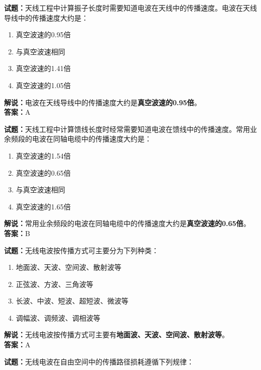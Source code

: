 \documentclass{ctexbook}
\begin{document}
\noindent\textbf{试题：}天线工程中计算振子长度时需要知道电波在天线中的传播速度。电波在天线导线中的传播速度大约是：

\begin{enumerate}[leftmargin=3em]
	\item 真空波速的0.95倍
	\item 与真空波速相同
	\item 真空波速的1.41倍
	\item 真空波速的1.05倍
\end{enumerate}

\noindent\textbf{解说：}电波在天线导线中的传播速度大约是\textbf{真空波速的0.95倍}。\\\noindent\textbf{答案：}A


\bigskip


\noindent\textbf{试题：}天线工程中计算馈线长度时经常需要知道电波在馈线中的传播速度。常用业余频段的电波在同轴电缆中的传播速度大约是：

\begin{enumerate}[leftmargin=3em]
	\item 真空波速的1.54倍
	\item 真空波速的0.65倍
	\item 与真空波速相同
	\item 真空波速的1.65倍
\end{enumerate}

\noindent\textbf{解说：}常用业余频段的电波在同轴电缆中的传播速度大约是\textbf{真空波速的0.65倍}。\\\noindent\textbf{答案：}B


\bigskip


\noindent\textbf{试题：}无线电波按传播方式可主要分为下列种类：

\begin{enumerate}[leftmargin=3em]
	\item 地面波、天波、空间波、散射波等
	\item 正弦波、方波、三角波等
	\item 长波、中波、短波、超短波、微波等
	\item 调幅波、调频波、调相波等
\end{enumerate}

\noindent\textbf{解说：}无线电波按传播方式可主要有\textbf{地面波、天波、空间波、散射波等}。\\\noindent\textbf{答案：}A


\bigskip


\noindent\textbf{试题：}无线电波在自由空间中的传播路径损耗遵循下列规律：
\end{document}
